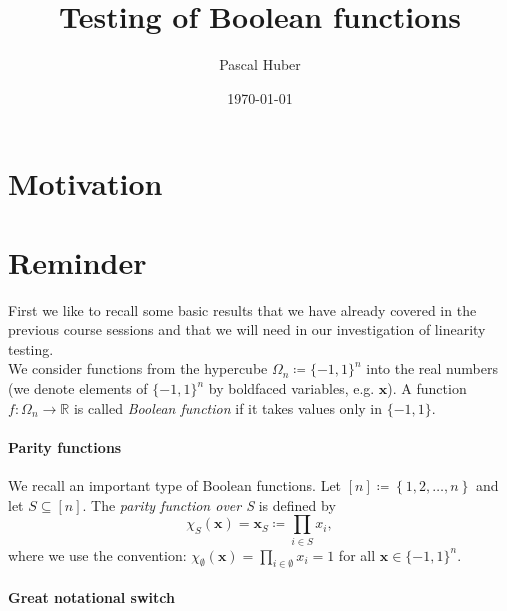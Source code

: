 \documentclass[a4paper]{article}
\newcommand{\real}{\mathbb{R}}
\newcommand{\nset}{[n]}
\newcommand{\boldx}{\boldsymbol{x}}
\theoremstyle{plain}
\theoremstyle{definition}
\theoremstyle{remark}
\begin{document}
\title{Testing of Boolean functions}
\author{Pascal Huber}
\date{\today}
\maketitle

\section{Motivation}
\label{sec:motivation}

\section{Reminder}
\label{sec:reminder}

First we like to recall some basic results that we have already
covered in the previous course sessions and that we will need in our
investigation of linearity testing. \\

\noindent We consider functions from the hypercube \(\Omega_n \coloneqq
\{-1,1\}^n\) into the real numbers (we denote elements of \(\{-1,1\}^n
\) by boldfaced variables, e.g. \(\boldx\)). A function \(f: \Omega_n
\rightarrow \real\) is called \emph{Boolean function} if it takes values only in
\(\{-1,1\}\). 

\paragraph{Parity functions}
\label{sec:parity-functions}

We recall an important type of Boolean functions. Let \(\nset
\coloneqq \left\{1,2, \dots, n\right\}\) and let \(S\subseteq
\nset\). The \emph{parity function over S} is defined by 
\[ \chi_S(\boldx) =  \boldx_S \coloneqq \prod_{i \in S} x_i, \]
where we use the convention: \(\chi_\emptyset(\boldx) = \prod_{i  \in
  \emptyset} x_i = 1\) for all \(\boldx \in \{-1,1\}^n\). 


\paragraph{Great notational switch}
\label{sec:great-notat-switch}
\end{document}
